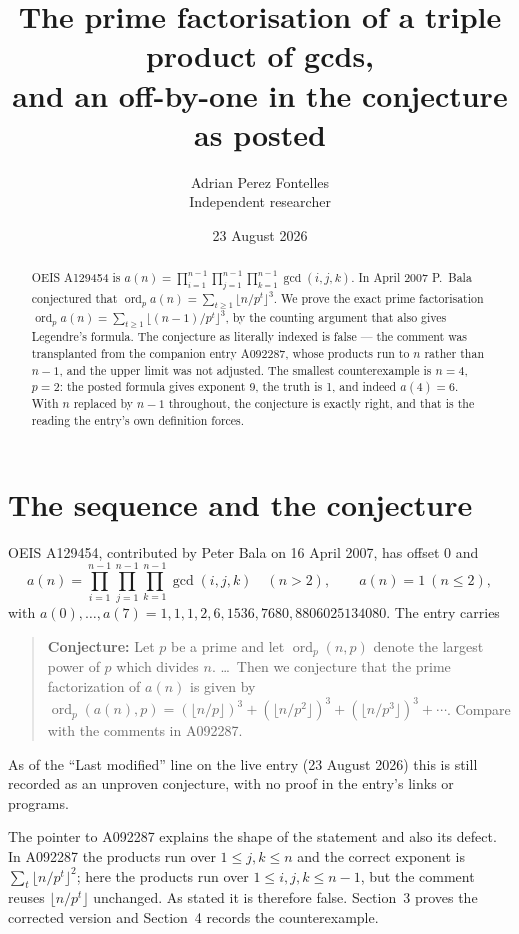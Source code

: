 \documentclass[11pt,a4paper]{article}
\title{The prime factorisation of a triple product of gcds,\\
and an off-by-one in the conjecture as posted}
\author{Adrian Perez Fontelles\\ \small Independent researcher}
\date{23 August 2026}
\theoremstyle{plain}
\theoremstyle{definition}
\begin{document}
\maketitle

\begin{abstract}
OEIS A129454 is $a(n)=\prod_{i=1}^{n-1}\prod_{j=1}^{n-1}\prod_{k=1}^{n-1}\gcd(i,j,k)$. In
April 2007 P.~Bala conjectured that
$\operatorname{ord}_{p}a(n)=\sum_{t\ge1}\lfloor n/p^{t}\rfloor^{3}$. We prove the exact
prime factorisation
$\operatorname{ord}_{p}a(n)=\sum_{t\ge1}\lfloor(n-1)/p^{t}\rfloor^{3}$, by the counting
argument that also gives Legendre's formula. The conjecture as literally indexed is false
--- the comment was transplanted from the companion entry A092287, whose products run to
$n$ rather than $n-1$, and the upper limit was not adjusted. The smallest counterexample is
$n=4$, $p=2$: the posted formula gives exponent 9, the truth is 1, and indeed $a(4)=6$.
With $n$ replaced by $n-1$ throughout, the conjecture is exactly right, and that is the
reading the entry's own definition forces.
\end{abstract}

\section{The sequence and the conjecture}

OEIS A129454, contributed by Peter Bala on 16 April 2007, has offset 0 and
\[
  a(n)=\prod_{i=1}^{n-1}\prod_{j=1}^{n-1}\prod_{k=1}^{n-1}\gcd(i,j,k)\quad(n>2),
  \qquad a(n)=1\ (n\le2),
\]
with $a(0),\dots,a(7)=1,1,1,2,6,1536,7680,8806025134080$. The entry carries

\begin{quote}
\textbf{Conjecture:} Let $p$ be a prime and let $\operatorname{ord}_{p}(n,p)$ denote the
largest power of $p$ which divides $n$. \dots\ Then we conjecture that the prime
factorization of $a(n)$ is given by $\operatorname{ord}_{p}(a(n),p)=(\lfloor
n/p\rfloor)^{3}+(\lfloor n/p^{2}\rfloor)^{3}+(\lfloor n/p^{3}\rfloor)^{3}+\cdots$. Compare
with the comments in A092287.
\end{quote}

As of the ``Last modified'' line on the live entry (23 August 2026) this is still recorded
as an unproven conjecture, with no proof in the entry's links or programs.

The pointer to A092287 explains the shape of the statement and also its defect. In A092287
the products run over $1\le j,k\le n$ and the correct exponent is
$\sum_{t}\lfloor n/p^{t}\rfloor^{2}$; here the products run over $1\le i,j,k\le n-1$, but
the comment reuses $\lfloor n/p^{t}\rfloor$ unchanged. As stated it is therefore false.
Section~3 proves the corrected version and Section~4 records the counterexample.
\end{document}
